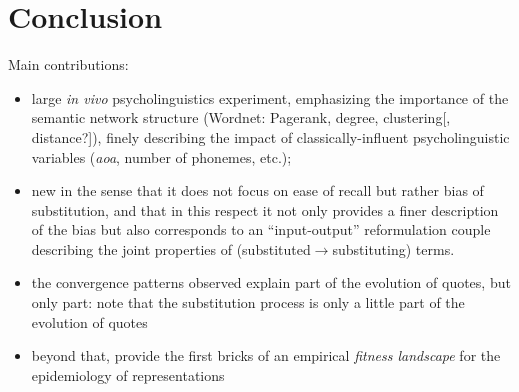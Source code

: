 \section{Conclusion}\label{sec:conclusion}

Main contributions:
\begin{itemize}
\item large \emph{in vivo} psycholinguistics experiment, emphasizing the importance of the semantic network structure (Wordnet: Pagerank, degree, clustering[, distance?]), finely describing the impact of classically-influent psycholinguistic variables (\emph{aoa}, number of phonemes, etc.); 
\item new in the sense that it does not focus on ease of recall but rather bias of substitution, and that in this respect it not only provides a finer description of the bias but also corresponds to an  ``input-output'' reformulation couple describing the joint properties of (substituted$\rightarrow$substituting) terms.
\item the convergence patterns observed explain part of the evolution of quotes, but only part: note that the substitution process is only a little part of the evolution of quotes
\item beyond that, provide the first bricks of an empirical \emph{fitness landscape} for the epidemiology of representations
\end{itemize}

